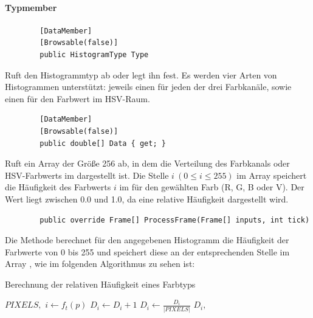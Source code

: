 \paragraph{Typmember}
\begin{itemize}
	\begin{verbatim}
		[DataMember]
		[Browsable(false)]
		public HistogramType Type
	\end{verbatim}
	Ruft den Histogrammtyp ab oder legt ihn fest. Es werden vier Arten von Histogrammen unterstützt: jeweils einen für jeden der drei Farbkanäle, sowie einen für den Farbwert im HSV-Raum.
	
	\begin{verbatim}
		[DataMember]
		[Browsable(false)]
		public double[] Data { get; }
	\end{verbatim}
	Ruft ein Array der Größe 256 ab, in dem die Verteilung des Farbkanals oder HSV-Farbwerts im  dargestellt ist. Die Stelle $ i \ (0 \leq i \leq 255) $ im Array speichert die Häufigkeit des Farbwerts $ i $ im  für den gewählten Farb (R, G, B oder V). Der Wert liegt zwischen 0.0 und 1.0, da eine relative Häufigkeit dargestellt wird.

	\begin{verbatim}
		public override Frame[] ProcessFrame(Frame[] inputs, int tick)
	\end{verbatim}
	Die Methode  berechnet für den angegebenen Histogramm die Häufigkeit der Farbwerte von 0 bis 255 und speichert diese an der entsprechenden Stelle im Array , wie im folgenden Algorithmus zu sehen ist:
	\begin{algorithm}[H]
		\caption{Berechnung der relativen Häufigkeit eines Farbtyps}
		\begin{algorithmic}[1]
			\REQUIRE $ PIXELS, $ 
			\STATE {}
				\STATE $ i \gets f_{t}(p) $
				\STATE $ D_i \gets D_i + 1 $
			\ENDFOR
				\STATE $ D_i \gets \frac{D_i}{|PIXELS|} $
			\ENDFOR
			\ENSURE $ D_i, $ 
		\end{algorithmic}
	\end{algorithm}

\end{itemize}

